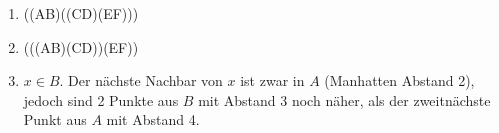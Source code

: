 \documentclass{homework}
\begin{document}
\begin{enumerate}
\begin{enumerate}
\end{enumerate}

\begin{enumerate}
\item ((AB)((CD)(EF)))
\item (((AB)(CD))(EF))
\item $x \in B$. Der nächste Nachbar von $x$ ist zwar in $A$ (Manhatten Abstand 2), jedoch sind 2 Punkte aus $B$ mit Abstand 3 noch näher, als der zweitnächste Punkt aus $A$ mit Abstand 4.
\end{enumerate}

\end{enumerate}
\end{document}
